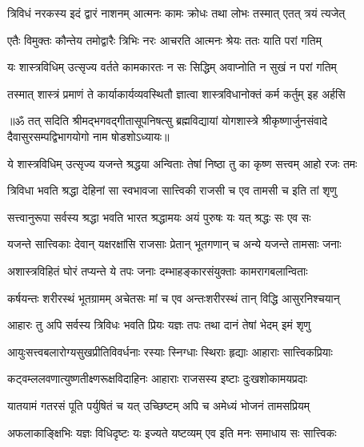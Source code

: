 \twolineshloka
{त्रिविधं नरकस्य इदं द्वारं नाशनम् आत्मनः}
{कामः क्रोधः तथा लोभः तस्मात् एतत् त्रयं त्यजेत्}%

\twolineshloka
{एतैः विमुक्तः कौन्तेय तमोद्वारैः त्रिभिः नरः}
{आचरति आत्मनः श्रेयः ततः याति परां गतिम्}%

\twolineshloka
{यः शास्त्रविधिम् उत्सृज्य वर्तते कामकारतः}
{न सः सिद्धिम् अवाप्नोति न सुखं न परां गतिम्}%

\twolineshloka
{तस्मात् शास्त्रं प्रमाणं ते कार्याकार्यव्यवस्थितौ}
{ज्ञात्वा शास्त्रविधानोक्तं कर्म कर्तुम् इह अर्हसि}%

{॥ॐ तत् सदिति श्रीमद्भगवद्गीतासूपनिषत्सु ब्रह्मविद्यायां योगशास्त्रे श्रीकृष्णार्जुनसंवादे दैवासुरसम्पद्विभागयोगो नाम षोडशोऽध्यायः॥}



\twolineshloka
{ये शास्त्रविधिम् उत्सृज्य यजन्ते श्रद्धया अन्विताः}
{तेषां निष्ठा तु का कृष्ण सत्त्वम् आहो रजः तमः}%


\twolineshloka
{त्रिविधा भवति श्रद्धा देहिनां सा स्वभावजा}
{सात्त्विकी राजसी च एव तामसी च इति तां शृणु}%

\twolineshloka
{सत्त्वानुरूपा सर्वस्य श्रद्धा भवति भारत}
{श्रद्धामयः अयं पुरुषः यः यत् श्रद्धः सः एव सः}%

\twolineshloka
{यजन्ते सात्त्विकाः देवान् यक्षरक्षांसि राजसाः}
{प्रेतान् भूतगणान् च अन्ये यजन्ते तामसाः जनाः}%

\twolineshloka
{अशास्त्रविहितं घोरं तप्यन्ते ये तपः जनाः}
{दम्भाहङ्कारसंयुक्ताः कामरागबलान्विताः}%

\twolineshloka
{कर्षयन्तः शरीरस्थं भूतग्रामम् अचेतसः}
{मां च एव अन्तःशरीरस्थं तान् विद्धि आसुरनिश्चयान्}%

\twolineshloka
{आहारः तु अपि सर्वस्य त्रिविधः भवति प्रियः}
{यज्ञः तपः तथा दानं तेषां भेदम् इमं शृणु}%

\twolineshloka
{आयुःसत्त्वबलारोग्यसुखप्रीतिविवर्धनाः}
{रस्याः स्निग्धाः स्थिराः हृद्याः आहाराः सात्त्विकप्रियाः}%

\twolineshloka
{कट्वम्ललवणात्युष्णतीक्ष्णरूक्षविदाहिनः}
{आहाराः राजसस्य इष्टाः दुःखशोकामयप्रदाः}%

\twolineshloka
{यातयामं गतरसं पूति पर्युषितं च यत्}
{उच्छिष्टम् अपि च अमेध्यं भोजनं तामसप्रियम्}%

\twolineshloka
{अफलाकाङ्क्षिभिः यज्ञः विधिदृष्टः यः इज्यते}
{यष्टव्यम् एव इति मनः समाधाय सः सात्त्विकः}%

